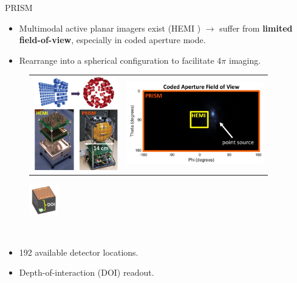 \documentclass[xcolor=x11names,compress]{beamer}
\renewcommand{\(}{\begin{columns}}
\renewcommand{\)}{\end{columns}}
\newcommand{\<}[1]{\begin{column}{#1}}
\renewcommand{\>}{\end{column}}
\begin{document}
\begin{frame}{PRISM}

\begin{itemize}
\item Multimodal active planar imagers exist (HEMI \cite{Galloway}) $\rightarrow$ suffer from \textbf{limited field-of-view}, especially in coded aperture mode. 
\item Rearrange into a spherical configuration to facilitate 4$\pi$ imaging.
\end{itemize}

\vspace{-10pt}

\begin{figure}
\begin{tabular}{cc}
\includegraphics[height=1.6in]{Figures/HEMIvPRISM.png} &
\includegraphics[height=1.4in]{Figures/FOV.png}
\end{tabular}
\end{figure}

\vspace{-15pt}

\begin{figure}
\includegraphics[width=0.5in]{Figures/DOI.png} 
\end{figure}

\textcolor{white}{a}
\vspace{1pt}

\begin{itemize}
\item 192 available detector locations.
\item Depth-of-interaction (DOI) readout.
\end{itemize}

\end{frame}
\end{document}
